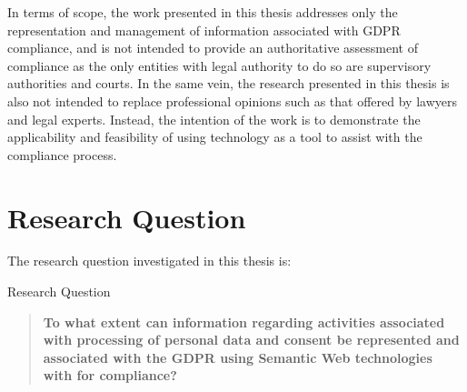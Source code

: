 In terms of scope, the work presented in this thesis addresses only the representation and management of information associated with GDPR compliance, and is not intended to provide an authoritative assessment of  compliance as the only entities with legal authority to do so are supervisory authorities and courts.
In the same vein, the research presented in this thesis is also not intended to replace professional opinions such as that offered by lawyers and legal experts.
Instead, the intention of the work is to demonstrate the applicability and feasibility of using technology as a tool to assist with the compliance process.

\section{Research Question}\label{sec:intro:RQ}
The research question investigated in this thesis is:
\begin{framed}
\small{Research Question}
\begin{quote}
\textbf{To what extent can information regarding activities associated with processing of personal data and consent be represented and associated with the GDPR using Semantic Web technologies with for compliance?}
\end{quote}
\end{framed}

